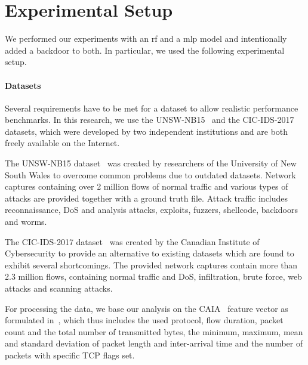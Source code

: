 \documentclass[10pt,sigconf,letterpaper,dvipsnames]{acmart}
\newcommand\note[2]{{\color{#1}#2}}
\newcommand\todo[1]{{\note{red}{TODO: #1}}}
\newcommand{\unsw}{UNSW-NB15}
\newcommand{\cic}{CIC-IDS-2017}
\begin{document}
\section{Experimental Setup} \label{sec:ml_approaches}
We performed our experiments with an \gls{rf} and a \gls{mlp} model and intentionally added a backdoor to both. In particular, we used the following experimental setup.
\paragraph{Datasets}

Several requirements have to be met for a dataset to allow realistic performance benchmarks. %
In this research, we use the \unsw{}~\cite{moustafa_unsw-nb15:_2015} and the \cic{}~\cite{sharafaldin_toward_2018} datasets, which were developed by two independent institutions and are both freely available on the Internet. %

The \unsw{} dataset~\cite{moustafa_unsw-nb15:_2015} was created by researchers of the University of New South Wales to overcome common problems due to outdated datasets. Network captures containing over 2 million flows of normal traffic and various types of attacks are provided together with a ground truth file. Attack traffic includes reconnaissance, DoS and analysis attacks, exploits, fuzzers,  shellcode, backdoors and worms.

The \cic{} dataset~\cite{sharafaldin_toward_2018} was created by the Canadian Institute of Cybersecurity to provide an alternative to existing datasets which are found to exhibit several shortcomings. The provided network captures contain more than 2.3 million flows, containing normal traffic and DoS, infiltration,  brute force, web attacks and scanning attacks.

For processing the data, we base our analysis on the CAIA~\cite{williams_preliminary_2006} feature vector as formulated in~\cite{meghdouri_analysis_2018}, which thus includes the used protocol, flow duration, packet count and the total number of transmitted bytes, the minimum, maximum, mean and standard deviation of packet length and inter-arrival time and the number of packets with specific TCP flags set.
\end{document}
